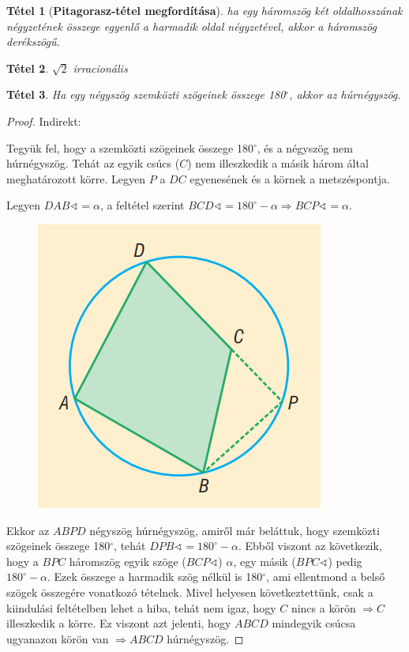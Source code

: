 \documentclass[12pt,a4paper]{article}
\newtheorem{theorem}{Tétel} [section]
\begin{document}
\begin{theorem}[\textbf{Pitagorasz-tétel megfordítása}]
ha egy háromszög két oldalhosszának négyzetének összege egyenlő a harmadik oldal négyzetével, akkor a háromszög derékszögű.
\end{theorem}

\begin{theorem}
$\sqrt{2}$ irracionális
\end{theorem}

\begin{theorem}
Ha egy négyszög szemközti szögeinek összege 180$^\circ$, akkor az húrnégyszög.
\end{theorem}
\begin{proof}
Indirekt:

Tegyük fel, hogy a szemközti szögeinek összege 180$^\circ$, és a négyszög nem húrnégyszög. Tehát az egyik csúcs ($C$) nem illeszkedik a másik három által meghatározott körre. Legyen $P$ a $DC$ egyenesének és a körnek a metszéspontja.

Legyen $DAB \sphericalangle=\alpha$, a feltétel szerint $BCD \sphericalangle=180^\circ-\alpha\Rightarrow BCP \sphericalangle = \alpha$.

\begin{figure}[h]
\centering
\includegraphics[scale=0.3]{geometry/hurnegyszog_biz}
\end{figure}

Ekkor az $ABPD$ négyszög húrnégyszög, amiről már beláttuk, hogy szemközti szögeinek összege 180$^\circ$, tehát $DPB \sphericalangle=180^\circ-\alpha$. Ebből viszont az következik, hogy a $BPC$ háromszög egyik szöge ($BCP\sphericalangle $) $\alpha$, egy másik ($BPC\sphericalangle $) pedig $180^\circ - \alpha$. Ezek összege a harmadik szög nélkül is 180$^\circ$, ami ellentmond a belső szögek összegére vonatkozó tételnek. Mivel helyesen következtettünk, csak a kiindulási feltételben lehet a hiba, tehát nem igaz, hogy $C$ nincs a körön $\Rightarrow C$ illeszkedik a körre. Ez viszont azt jelenti, hogy $ABCD$ mindegyik csúcsa ugyanazon körön van $\Rightarrow ABCD$ húrnégyszög.
\end{proof}
\newpage
\end{document}

